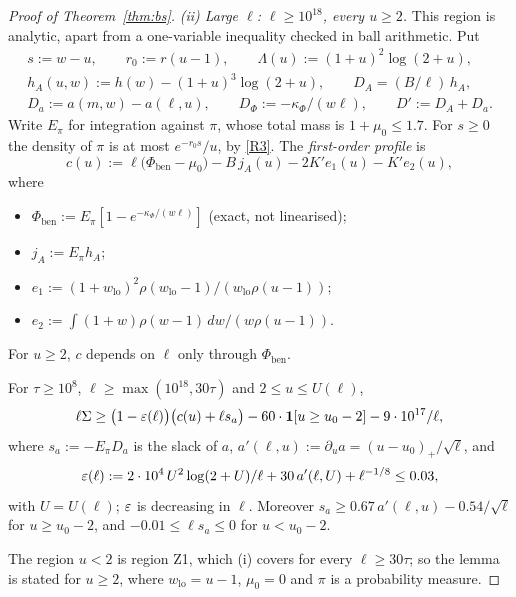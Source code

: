 \begin{proof}[Proof of Theorem~\ref{thm:bs}]
\smallskip\noindent\emph{(ii) Large $\ell$: $\ell\ge10^{18}$, every $u\ge2$.} This region is analytic, apart from a
one-variable inequality checked in ball arithmetic. Put
\begin{gather*}
  s:=w-u,\qquad r_0:=r(u-1),\qquad\Lambda(u):=(1+u)^2\log(2+u),\\ h_A(u,w):=h(w)-(1+u)^3\log(2+u),\qquad
  D_A=(B/\ell)\,h_A,\\ D_a:=a(m,w)-a(\ell,u),\qquad D_\Phi:=-\kappa_\Phi/(w\ell),\qquad D':=D_A+D_a .
\end{gather*}
Write $E_\pi$ for integration against $\pi$, whose total mass is $1+\mu_0\le1.7$. For $s\ge0$ the density of $\pi$ is at most
$e^{-r_0s}/u$, by \ref{R3}. The \emph{first-order profile} is
\[
  c(u):=\ell\big(\Phi_{\mathrm{ben}}-\mu_0\big)-B\,j_A(u)-2K'e_1(u)-K'e_2(u),
\]
where
\begin{itemize}
\item $\Phi_{\mathrm{ben}}:=E_\pi[1-e^{-\kappa_\Phi/(w\ell)}]$ (exact, not linearised);
\item $j_A:=E_\pi h_A$;
\item $e_1:=(1+w_{\mathrm{lo}})^2\rho(w_{\mathrm{lo}}-1)/(w_{\mathrm{lo}}\rho(u-1))$;
\item $e_2:=\int(1+w)\rho(w-1)\,dw/(w\rho(u-1))$.
\end{itemize}
For $u\ge2$, $c$ depends on $\ell$ only through $\Phi_{\mathrm{ben}}$.

\begin{lemma}\label{lem:bs-remainder}
For $\tau\ge10^8$, $\ell\ge\max(10^{18},30\tau)$ and $2\le u\le U(\ell)$,
\[
  \ell\Sigma\ge\big(1-\varepsilon(\ell)\big)\big(c(u)+\ell s_a\big)-60\cdot\mathbf 1[u\ge u_0-2]-9\cdot10^{17}/\ell,
\]
where $s_a:=-E_\pi D_a$ is the slack of $a$, $a'(\ell,u):=\partial_ua=(u-u_0)_+/\sqrt\ell$, and
\[
  \varepsilon(\ell):=2\cdot10^4\,U^2\log(2+U)/\ell+30\,a'(\ell,U)+\ell^{-1/8}\le0.03 ,
\]
with $U=U(\ell)$; $\varepsilon$ is decreasing in $\ell$. Moreover $s_a\ge0.67\,a'(\ell,u)-0.54/\sqrt\ell$ for $u\ge u_0-2$, and
$-0.01\le\ell s_a\le0$ for $u<u_0-2$.
\end{lemma}

The region $u<2$ is region Z1, which (i) covers for every $\ell\ge30\tau$; so the lemma is stated for $u\ge2$, where
$w_{\mathrm{lo}}=u-1$, $\mu_0=0$ and $\pi$ is a probability measure.


\end{proof}
